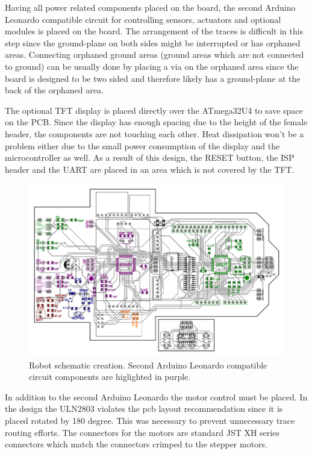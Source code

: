 \documentclass[11pt,a4paper]{article}
\begin{document}
Having all power related components placed on the board, the second Arduino Leonardo compatible circuit for controlling sensors, actuators and optional modules is placed on the board. The arrangement of the traces is difficult in this step since the ground-plane on both sides might be interrupted or has orphaned areas. Connecting orphaned ground areas (ground areas which are not connected to ground) can be usually done by placing a via on the orphaned area since the board is designed to be two sided and therefore likely has a ground-plane at the back of the orphaned area.

The optional TFT display is placed directly over the ATmega32U4 to save space on the PCB. Since the display has enough spacing due to the height of the female header, the components are not touching each other. Heat dissipation won't be a problem either due to the small power consumption of the display and the microcontroller as well. As a result of this design, the RESET button, the ISP header and the UART are placed in an area which is not covered by the TFT.

\begin{figure}[H]
  \centering
  \includegraphics[width=\textwidth]{robot_schematic_brain.pdf}
  \caption{Robot schematic creation. Second Arduino Leonardo compatible circuit components are higlighted in purple.}
\end{figure}

In addition to the second Arduino Leonardo the motor control must be placed. In the design the ULN2803 violates the pcb layout recommendation since it is placed rotated by 180 degree. This was necessary to prevent unnecessary  trace routing efforts. The connectors for the motors are standard JST XH series connectors which match the connectors crimped to the stepper motors.
\end{document}
